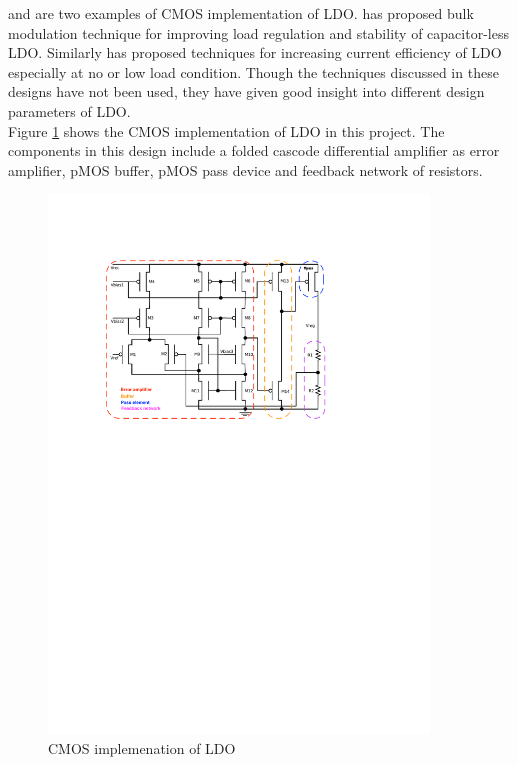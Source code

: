 \documentclass[12pt,a4paper,UKenglish]{article}
\begin{document}
\cite{ldo_bulkmod} and \cite{ldo_quiescent} are two examples of CMOS implementation of LDO. \cite{ldo_bulkmod} has proposed bulk modulation technique for improving load regulation and stability of capacitor-less LDO. Similarly \cite{ldo_quiescent} has  proposed techniques for increasing current efficiency of LDO especially at no or low load condition. Though the techniques discussed in these designs have not been used, they have given good insight into different design parameters of LDO.  \\

Figure \ref{ldo_cmos} shows the CMOS implementation of LDO in this project. The components in this design include a folded cascode differential amplifier as error amplifier, pMOS buffer, pMOS pass device and feedback network of resistors. 

\begin{figure}[htbp] %
   \centering
   \includegraphics[width=0.9\textwidth]{img/sch_ldo.pdf} 
   \caption{CMOS implemenation of LDO}
   \label{ldo_cmos}
\end{figure}
\end{document}
